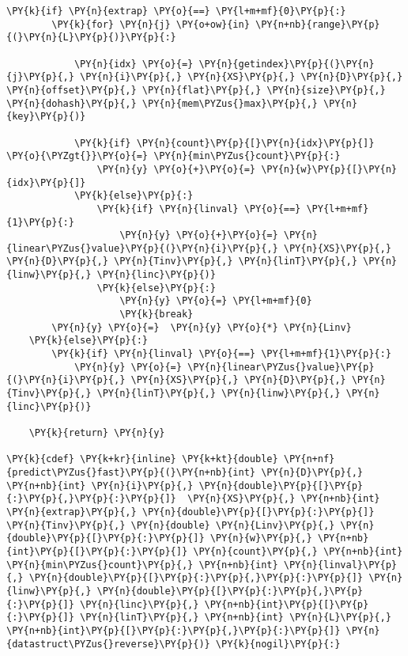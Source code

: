 \begin{Verbatim}[commandchars=\\\{\}]
    \PY{k}{if} \PY{n}{extrap} \PY{o}{==} \PY{l+m+mf}{0}\PY{p}{:}
        \PY{k}{for} \PY{n}{j} \PY{o+ow}{in} \PY{n+nb}{range}\PY{p}{(}\PY{n}{L}\PY{p}{)}\PY{p}{:} 
        
            \PY{n}{idx} \PY{o}{=} \PY{n}{getindex}\PY{p}{(}\PY{n}{j}\PY{p}{,} \PY{n}{i}\PY{p}{,} \PY{n}{XS}\PY{p}{,} \PY{n}{D}\PY{p}{,} \PY{n}{offset}\PY{p}{,} \PY{n}{flat}\PY{p}{,} \PY{n}{size}\PY{p}{,} \PY{n}{dohash}\PY{p}{,} \PY{n}{mem\PYZus{}max}\PY{p}{,} \PY{n}{key}\PY{p}{)}
           
            \PY{k}{if} \PY{n}{count}\PY{p}{[}\PY{n}{idx}\PY{p}{]} \PY{o}{\PYZgt{}}\PY{o}{=} \PY{n}{min\PYZus{}count}\PY{p}{:}
                \PY{n}{y} \PY{o}{+}\PY{o}{=} \PY{n}{w}\PY{p}{[}\PY{n}{idx}\PY{p}{]}
            \PY{k}{else}\PY{p}{:}
                \PY{k}{if} \PY{n}{linval} \PY{o}{==} \PY{l+m+mf}{1}\PY{p}{:}
                    \PY{n}{y} \PY{o}{+}\PY{o}{=} \PY{n}{linear\PYZus{}value}\PY{p}{(}\PY{n}{i}\PY{p}{,} \PY{n}{XS}\PY{p}{,} \PY{n}{D}\PY{p}{,} \PY{n}{Tinv}\PY{p}{,} \PY{n}{linT}\PY{p}{,} \PY{n}{linw}\PY{p}{,} \PY{n}{linc}\PY{p}{)}
                \PY{k}{else}\PY{p}{:}
                    \PY{n}{y} \PY{o}{=} \PY{l+m+mf}{0}
                    \PY{k}{break}
        \PY{n}{y} \PY{o}{=}  \PY{n}{y} \PY{o}{*} \PY{n}{Linv}
    \PY{k}{else}\PY{p}{:}
        \PY{k}{if} \PY{n}{linval} \PY{o}{==} \PY{l+m+mf}{1}\PY{p}{:}
            \PY{n}{y} \PY{o}{=} \PY{n}{linear\PYZus{}value}\PY{p}{(}\PY{n}{i}\PY{p}{,} \PY{n}{XS}\PY{p}{,} \PY{n}{D}\PY{p}{,} \PY{n}{Tinv}\PY{p}{,} \PY{n}{linT}\PY{p}{,} \PY{n}{linw}\PY{p}{,} \PY{n}{linc}\PY{p}{)}
    
    \PY{k}{return} \PY{n}{y}

\PY{k}{cdef} \PY{k+kr}{inline} \PY{k+kt}{double} \PY{n+nf}{predict\PYZus{}fast}\PY{p}{(}\PY{n+nb}{int} \PY{n}{D}\PY{p}{,} \PY{n+nb}{int} \PY{n}{i}\PY{p}{,} \PY{n}{double}\PY{p}{[}\PY{p}{:}\PY{p}{,}\PY{p}{:}\PY{p}{]}  \PY{n}{XS}\PY{p}{,} \PY{n+nb}{int} \PY{n}{extrap}\PY{p}{,} \PY{n}{double}\PY{p}{[}\PY{p}{:}\PY{p}{]} \PY{n}{Tinv}\PY{p}{,} \PY{n}{double} \PY{n}{Linv}\PY{p}{,} \PY{n}{double}\PY{p}{[}\PY{p}{:}\PY{p}{]} \PY{n}{w}\PY{p}{,} \PY{n+nb}{int}\PY{p}{[}\PY{p}{:}\PY{p}{]} \PY{n}{count}\PY{p}{,} \PY{n+nb}{int} \PY{n}{min\PYZus{}count}\PY{p}{,} \PY{n+nb}{int} \PY{n}{linval}\PY{p}{,} \PY{n}{double}\PY{p}{[}\PY{p}{:}\PY{p}{,}\PY{p}{:}\PY{p}{]} \PY{n}{linw}\PY{p}{,} \PY{n}{double}\PY{p}{[}\PY{p}{:}\PY{p}{,}\PY{p}{:}\PY{p}{]} \PY{n}{linc}\PY{p}{,} \PY{n+nb}{int}\PY{p}{[}\PY{p}{:}\PY{p}{]} \PY{n}{linT}\PY{p}{,} \PY{n+nb}{int} \PY{n}{L}\PY{p}{,} \PY{n+nb}{int}\PY{p}{[}\PY{p}{:}\PY{p}{,}\PY{p}{:}\PY{p}{]} \PY{n}{datastruct\PYZus{}reverse}\PY{p}{)} \PY{k}{nogil}\PY{p}{:}


\end{Verbatim}
